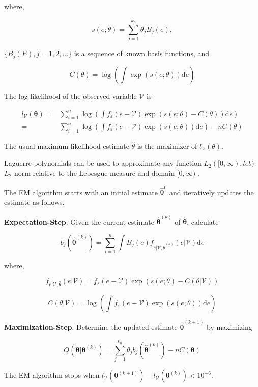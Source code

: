 \documentclass[
  12pt]{article}
\theoremstyle{definition}
\theoremstyle{remark}
\begin{document}
where,

\[
s(e;\theta)=\sum_{j=1}^{k_n}\theta_j B_j(e),
\]

\(\{B_j(E), j=1,2,\dots\}\) is a sequence of known basis functions, and

\[
C(\theta) = \log\left(\int \exp(s(e;\theta)) \text{d}e \right)
\]

The log likelihood of the observed variable \(\mathcal{V}\) is

\[
\begin{aligned}
    l_{\mathcal{V}}(\mathbf{\theta})=&\sum_{i=1}^{n}\log \left(\int f_{\varepsilon}(e-\mathcal{V})\exp(s(e;\theta)-C(\theta))\text{d}e\right)\\
    =&\sum_{i=1}^{n}\log \left(\int f_{\varepsilon}(e-\mathcal{V})\exp(s(e;\theta))\text{d}e\right)-nC(\theta)
\end{aligned}
\]

The usual maximum likelihood estimate \(\hat{\theta}\) is the maximizer
of \(l_{\mathcal{V}}(\theta)\).

Laguerre polynomials can be used to approximate any function
\(L_2([0,\infty), leb)\) \(L_2\) norm relative to the Lebesgue measure
and domain \([0,\infty)\) \citep{Chen2007}.

The EM algorithm \citep{Kang2021} starts with an initial estimate
\(\hat{\mathbf{\theta}}^0\) and iteratively updates the estimate as
follows.

\textbf{Expectation-Step}: Given the current estimate
\(\hat{\mathbf{\theta}}^{(k)}\) of \(\hat{\mathbf{\theta}}\), calculate

\[
 b_j \left(\hat{\mathbf{\theta}}^{(k)}\right) = \sum_{i=1}^{n}\int B_j(e)f_{e|\mathcal{V},\hat{\theta}^{(k)}}(e|\mathcal{V})\text{d}e
\]

where,

\[
f_{e|\mathcal{V},\hat{\theta}}(e|\mathcal{V}) = f_{\varepsilon}(e-\mathcal{V})\exp(s(e;\theta)-C(\theta|\mathcal{V}))
\]

\[
C(\theta|\mathcal{V})=\log\left(\int f_{\varepsilon}(e-\mathcal{V})\exp(s(e;\theta))\text{d}e\right)
\]

\textbf{Maximization-Step}: Determine the updated estimate
\(\hat{\mathbf{\theta}}^{(k+1)}\) by maximizing

\[
Q(\mathbf{\theta}|\mathbf{\theta}^{(k)}) = \sum_{j=1}^{k_n}\theta_j b_j \left(\hat{\mathbf{\theta}}^{(k)}\right) - nC(\mathbf{\theta})
\]

The EM algorithm stops when
\(l_{\mathcal{V}}(\mathbf{\theta}^{(k+1)})-l_{\mathcal{V}}(\mathbf{\theta}^{(k)})<10^{-6}\).
\end{document}
